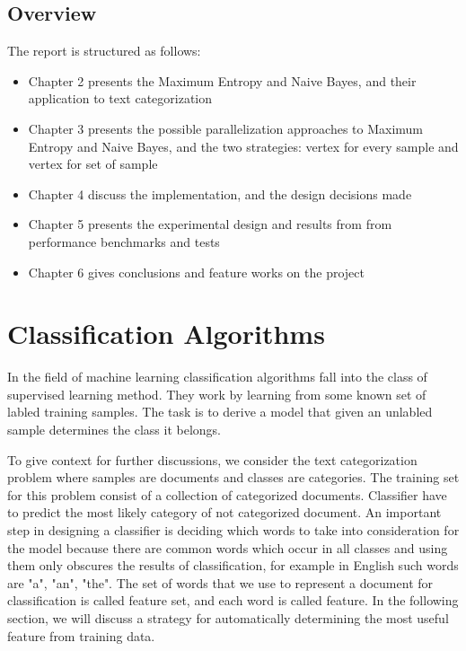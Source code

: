 \documentclass{report}
\begin{document}
\section{Overview}

The report is structured as follows: 

\begin{itemize}
\item Chapter 2 presents the Maximum Entropy and Naive Bayes, and their application to text categorization
\item Chapter 3 presents the possible parallelization approaches to Maximum Entropy and Naive Bayes, and the two strategies: vertex for every sample and vertex for set of sample
\item Chapter 4 discuss the implementation, and the design decisions made
\item Chapter 5 presents the experimental design and results from from performance benchmarks and tests
\item Chapter 6 gives conclusions and feature works on the project
\end{itemize}

\chapter{Classification Algorithms}

In the field of machine learning classification algorithms fall into the class of supervised learning method. They work by learning from some known set of labled training samples. The task is to derive a model that  given an unlabled sample determines the class it belongs.

To give context for further discussions, we consider the text categorization problem where samples are documents and classes are categories. The training set for this problem consist of a collection of categorized documents. Classifier have to predict the most likely category of not categorized document. An important step in designing a classifier is deciding which words to take into consideration for the model because there are common words which occur in all classes and using them only obscures the results of classification, for example in English such words are "a", "an", "the". The set of words that we use to represent a document for classification is called feature set, and each word is called feature. In the following section, we will discuss a strategy for automatically determining the most useful feature from training data.
\end{document}

